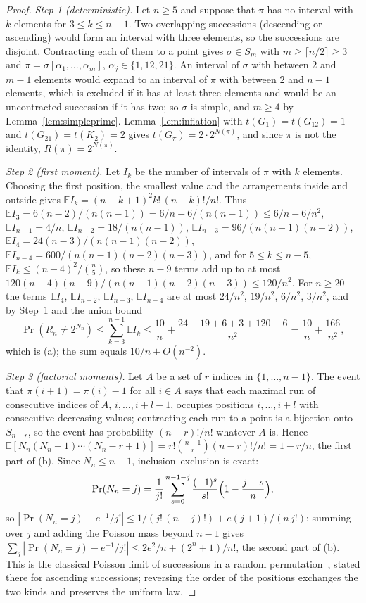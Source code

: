\begin{proof}
\emph{Step 1 (deterministic).} Let $n\ge5$ and suppose that $\pi$ has no interval with $k$ elements for $3\le k\le n-1$. Two overlapping successions (descending or ascending) would form an interval with three elements, so the successions are disjoint. Contracting each of them to a point gives $\sigma\in S_m$ with $m\ge\lceil n/2\rceil\ge3$ and $\pi=\sigma[\alpha_1,\dots,\alpha_m]$, $\alpha_j\in\{1,12,21\}$. An interval of $\sigma$ with between $2$ and $m-1$ elements would expand to an interval of $\pi$ with between $2$ and $n-1$ elements, which is excluded if it has at least three elements and would be an uncontracted succession if it has two; so $\sigma$ is simple, and $m\ge4$ by Lemma~\ref{lem:simpleprime}. Lemma~\ref{lem:inflation} with $t(G_{1})=t(G_{12})=1$ and $t(G_{21})=t(K_2)=2$ gives $t(G_\pi)=2\cdot2^{N(\pi)}$, and since $\pi$ is not the identity, $R(\pi)=2^{N(\pi)}$.

\emph{Step 2 (first moment).} Let $I_k$ be the number of intervals of $\pi$ with $k$ elements. Choosing the first position, the smallest value and the arrangements inside and outside gives $\mathbb E I_k=(n-k+1)^2k!\,(n-k)!/n!$. Thus $\mathbb E I_3=6(n-2)/(n(n-1))=6/n-6/(n(n-1))\le6/n-6/n^2$, $\mathbb E I_{n-1}=4/n$, $\mathbb E I_{n-2}=18/(n(n-1))$, $\mathbb E I_{n-3}=96/(n(n-1)(n-2))$, $\mathbb E I_4=24(n-3)/(n(n-1)(n-2))$, $\mathbb E I_{n-4}=600/(n(n-1)(n-2)(n-3))$, and for $5\le k\le n-5$, $\mathbb E I_k\le(n-4)^2/\binom n5$, so these $n-9$ terms add up to at most $120(n-4)(n-9)/(n(n-1)(n-2)(n-3))\le120/n^2$. For $n\ge20$ the terms $\mathbb E I_4$, $\mathbb E I_{n-2}$, $\mathbb E I_{n-3}$, $\mathbb E I_{n-4}$ are at most $24/n^2$, $19/n^2$, $6/n^2$, $3/n^2$, and by Step~1 and the union bound
\[
\Pr(R_n\ne2^{N_n})\le\sum_{k=3}^{n-1}\mathbb E I_k\le\frac{10}{n}+\frac{24+19+6+3+120-6}{n^2}=\frac{10}{n}+\frac{166}{n^2},
\]
which is (a); the sum equals $10/n+O(n^{-2})$.

\emph{Step 3 (factorial moments).} Let $A$ be a set of $r$ indices in $\{1,\dots,n-1\}$. The event that $\pi(i+1)=\pi(i)-1$ for all $i\in A$ says that each maximal run of consecutive indices of $A$, $i,\dots,i+l-1$, occupies positions $i,\dots,i+l$ with consecutive decreasing values; contracting each run to a point is a bijection onto $S_{n-r}$, so the event has probability $(n-r)!/n!$ whatever $A$ is. Hence $\mathbb E[N_n(N_n-1)\cdots(N_n-r+1)]=r!\binom{n-1}r(n-r)!/n!=1-r/n$, the first part of (b). Since $N_n\le n-1$, inclusion--exclusion is exact:
\[
\Pr(N_n=j)=\frac1{j!}\sum_{s=0}^{n-1-j}\frac{(-1)^s}{s!}\Bigl(1-\frac{j+s}n\Bigr),
\]
so $|\Pr(N_n=j)-e^{-1}/j!|\le1/(j!\,(n-j)!)+e(j+1)/(n\,j!)$; summing over $j$ and adding the Poisson mass beyond $n-1$ gives $\sum_j|\Pr(N_n=j)-e^{-1}/j!|\le2e^2/n+(2^n+1)/n!$, the second part of (b). This is the classical Poisson limit of successions in a random permutation~\citep{wolfowitz1944,kaplansky1945}, stated there for ascending successions; reversing the order of the positions exchanges the two kinds and preserves the uniform law.


\end{proof}
